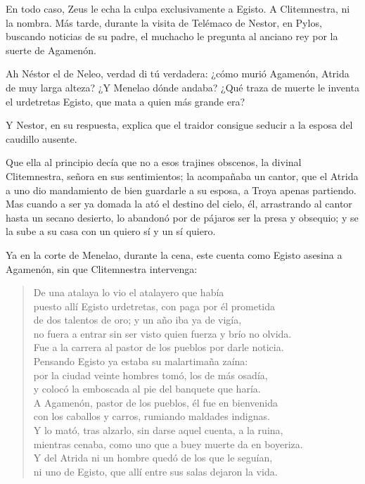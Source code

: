 En todo caso, Zeus le echa la culpa exclusivamente a Egisto. A Clitemnestra, ni la nombra. Más tarde, durante la visita de Telémaco de Nestor, en Pylos, buscando noticias de su padre, el muchacho le pregunta al anciano rey por la suerte de Agamenón. 

Ah Néstor el de Neleo, verdad di tú verdadera:
¿cómo murió Agamenón, Atrida de muy larga alteza?
¿Y Menelao dónde andaba? ¿Qué traza de muerte le inventa
el urdetretas Egisto, que mata a quien más grande era?			


Y Nestor, en su respuesta, explica que el traidor consigue seducir a la esposa del caudillo ausente.

Que ella al principio decía que no a esos trajines obscenos,		
la divinal Clitemnestra, señora en sus sentimientos;
la acompañaba un cantor, que el Atrida a uno dio mandamiento
de bien guardarle a su esposa, a Troya apenas partiendo.
Mas cuando a ser ya domada la ató el destino del cielo,
él, arrastrando al cantor hasta un secano desierto,				
lo abandonó por de pájaros ser la presa y obsequio;
y se la sube a su casa con un quiero sí y un sí quiero.

Ya en la corte de Menelao, durante la cena, este cuenta como Egisto asesina a Agamenón, sin que Clitemnestra intervenga:





\begin{verse}
De una atalaya lo vio el atalayero que había\\
puesto allí Egisto urdetretas, con paga por él prometida\\
de dos talentos de oro; y un año iba ya de vigía,\\
no fuera a entrar sin ser visto quien fuerza y brío no olvida.\\
Fue a la carrera al pastor de los pueblos por darle noticia.\\
Pensando Egisto ya estaba su malartimaña zaína:\\
por la ciudad veinte hombres tomó, los de más osadía,\\
y colocó la emboscada al pie del banquete que haría.\\
A Agamenón, pastor de los pueblos, él fue en bienvenida\\
con los caballos y carros, rumiando maldades indignas.\\
Y lo mató, tras alzarlo, sin darse aquel cuenta, a la ruina,\\
mientras cenaba, como uno que a buey muerte da en boyeriza.\\
Y del Atrida ni un hombre quedó de los que le seguían,\\
ni uno de Egisto, que allí entre sus salas dejaron la vida.
\end{verse}

